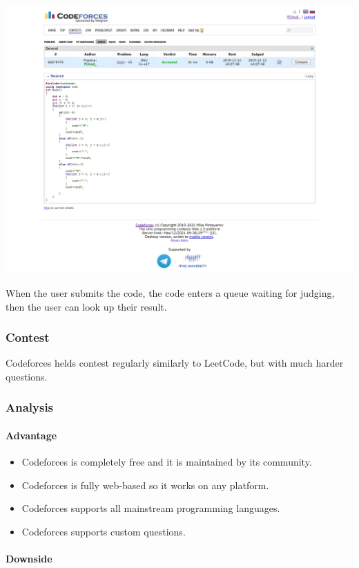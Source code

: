 \documentclass[a4paper]{report}
\begin{document}
\includegraphics[width=\linewidth]{Submission-66675479-Codeforces}

When the user submits the code, the code enters a queue waiting for judging, then the user can look up their result.

\subsubsection{Contest}

Codeforces helds contest regularly similarly to LeetCode, but with much harder questions.

\subsubsection{Analysis}

\paragraph{Advantage}

\begin{itemize}
    \item Codeforces is completely free and it is maintained by its community.
    \item Codeforces is fully web-based so it works on any platform.
    \item Codeforces supports all mainstream programming languages.
    \item Codeforces supports custom questions.
\end{itemize}

\paragraph{Downside}
\end{document}
